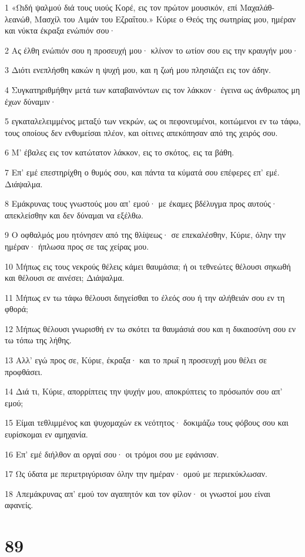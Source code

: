 \par 1 «Ωιδή ψαλμού διά τους υιούς Κορέ, εις τον πρώτον μουσικόν, επί Μαχαλάθ-λεανώθ, Μασχίλ του Αιμάν του Εζραΐτου.» Κύριε ο Θεός της σωτηρίας μου, ημέραν και νύκτα έκραξα ενώπιόν σου·
\par 2 Ας έλθη ενώπιόν σου η προσευχή μου· κλίνον το ωτίον σου εις την κραυγήν μου·
\par 3 Διότι ενεπλήσθη κακών η ψυχή μου, και η ζωή μου πλησιάζει εις τον άδην.
\par 4 Συγκατηριθμήθην μετά των καταβαινόντων εις τον λάκκον· έγεινα ως άνθρωπος μη έχων δύναμιν·
\par 5 εγκαταλελειμμένος μεταξύ των νεκρών, ως οι πεφονευμένοι, κοιτώμενοι εν τω τάφω, τους οποίους δεν ενθυμείσαι πλέον, και οίτινες απεκόπησαν από της χειρός σου.
\par 6 Μ' έβαλες εις τον κατώτατον λάκκον, εις το σκότος, εις τα βάθη.
\par 7 Επ' εμέ επεστηρίχθη ο θυμός σου, και πάντα τα κύματά σου επέφερες επ' εμέ. Διάψαλμα.
\par 8 Εμάκρυνας τους γνωστούς μου απ' εμού· με έκαμες βδέλυγμα προς αυτούς· απεκλείσθην και δεν δύναμαι να εξέλθω.
\par 9 Ο οφθαλμός μου ητόνησεν από της θλίψεως· σε επεκαλέσθην, Κύριε, όλην την ημέραν· ήπλωσα προς σε τας χείρας μου.
\par 10 Μήπως εις τους νεκρούς θέλεις κάμει θαυμάσια; ή οι τεθνεώτες θέλουσι σηκωθή και θέλουσι σε αινέσει; Διάψαλμα.
\par 11 Μήπως εν τω τάφω θέλουσι διηγείσθαι το έλεός σου ή την αλήθειάν σου εν τη φθορά;
\par 12 Μήπως θέλουσι γνωρισθή εν τω σκότει τα θαυμάσιά σου και η δικαιοσύνη σου εν τω τόπω της λήθης.
\par 13 Αλλ' εγώ προς σε, Κύριε, έκραξα· και το πρωΐ η προσευχή μου θέλει σε προφθάσει.
\par 14 Διά τι, Κύριε, απορρίπτεις την ψυχήν μου, αποκρύπτεις το πρόσωπόν σου απ' εμού;
\par 15 Είμαι τεθλιμμένος και ψυχομαχών εκ νεότητος· δοκιμάζω τους φόβους σου και ευρίσκομαι εν αμηχανία.
\par 16 Επ' εμέ διήλθον αι οργαί σου· οι τρόμοι σου με εφάνισαν.
\par 17 Ως ύδατα με περιετριγύρισαν όλην την ημέραν· ομού με περιεκύκλωσαν.
\par 18 Απεμάκρυνας απ' εμού τον αγαπητόν και τον φίλον· οι γνωστοί μου είναι αφανείς.

\chapter{89}

